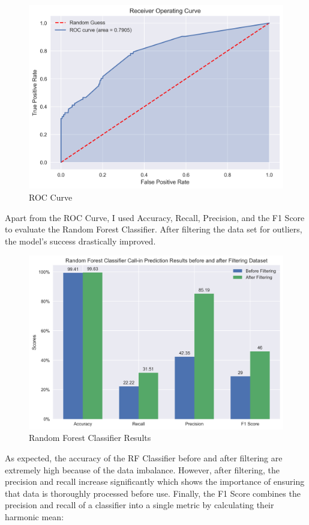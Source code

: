 \documentclass{article}
\begin{document}
\begin{figure}[htp]
    \centering
    \includegraphics[width=12cm]{visuals/roc.png}
    \caption{ROC Curve}
\end{figure}

\newpage

\noindent
Apart from the ROC Curve, I used Accuracy, Recall, Precision, and the F1 Score to evaluate the Random Forest Classifier. After filtering the data set for outliers, the model's success drastically improved.

\begin{figure}[htp]
    \centering
    \includegraphics[width=12cm]{visuals/results_call-in.png}
    \caption{Random Forest Classifier Results}
\end{figure}

\noindent
As expected, the accuracy of the RF Classifier before and after filtering are extremely high because of the data imbalance. However, after filtering, the precision and recall increase significantly which shows the importance of ensuring that data is thoroughly processed before use. Finally, the F1 Score combines the precision and recall of a classifier into a single metric by calculating their harmonic mean: 
\end{document}
